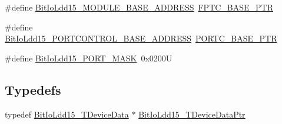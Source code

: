 \begin{DoxyCompactItemize}
\#define \hyperlink{group___bit_io_ldd15__module_ga4d75a3ea9185102ecf4d68793c4b0a6f}{Bit\+Io\+Ldd15\+\_\+\+M\+O\+D\+U\+L\+E\+\_\+\+B\+A\+S\+E\+\_\+\+A\+D\+D\+R\+E\+SS}~\hyperlink{group___backward___compatibility___symbols_gaed3b8398ebed63795f9ce57eb9a59097}{F\+P\+T\+C\+\_\+\+B\+A\+S\+E\+\_\+\+P\+TR}
\item 
\#define \hyperlink{group___bit_io_ldd15__module_ga38c690112da6266a607c0056ca3a88a2}{Bit\+Io\+Ldd15\+\_\+\+P\+O\+R\+T\+C\+O\+N\+T\+R\+O\+L\+\_\+\+B\+A\+S\+E\+\_\+\+A\+D\+D\+R\+E\+SS}~\hyperlink{group___p_o_r_t___peripheral_ga03c740cdda17711afafc932723871474}{P\+O\+R\+T\+C\+\_\+\+B\+A\+S\+E\+\_\+\+P\+TR}
\item 
\#define \hyperlink{group___bit_io_ldd15__module_ga3d9bce4012d1ef9969702f592cb6f5e7}{Bit\+Io\+Ldd15\+\_\+\+P\+O\+R\+T\+\_\+\+M\+A\+SK}~0x0200U
\end{DoxyCompactItemize}
\subsection*{Typedefs}
\begin{DoxyCompactItemize}
\item 
typedef \hyperlink{struct_bit_io_ldd15___t_device_data}{Bit\+Io\+Ldd15\+\_\+\+T\+Device\+Data} $\ast$ \hyperlink{group___bit_io_ldd15__module_gab121a1bc3c07e68d2b0beb9e835ab51f}{Bit\+Io\+Ldd15\+\_\+\+T\+Device\+Data\+Ptr}
\end{DoxyCompactItemize}
